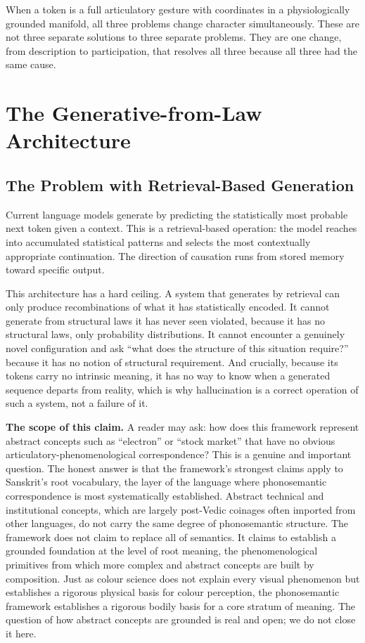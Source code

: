 \documentclass[12pt]{article}
\begin{document}
When a token is a full articulatory gesture with coordinates in a physiologically grounded manifold, all three problems change character simultaneously. These are not three separate solutions to three separate problems. They are one change, from description to participation, that resolves all three because all three had the same cause.


\section{The Generative-from-Law Architecture}

\subsection{The Problem with Retrieval-Based Generation}

Current language models generate by predicting the statistically most probable next token given a context. This is a retrieval-based operation: the model reaches into accumulated statistical patterns and selects the most contextually appropriate continuation. The direction of causation runs from stored memory toward specific output.

This architecture has a hard ceiling. A system that generates by retrieval can only produce recombinations of what it has statistically encoded. It cannot generate from structural laws it has never seen violated, because it has no structural laws, only probability distributions. It cannot encounter a genuinely novel configuration and ask ``what does the structure of this situation require?'' because it has no notion of structural requirement. And crucially, because its tokens carry no intrinsic meaning, it has no way to know when a generated sequence departs from reality, which is why hallucination is a correct operation of such a system, not a failure of it.

\textbf{The scope of this claim.} A reader may ask: how does this framework represent abstract concepts such as ``electron'' or ``stock market'' that have no obvious articulatory-phenomenological correspondence? This is a genuine and important question. The honest answer is that the framework's strongest claims apply to Sanskrit's root vocabulary, the layer of the language where phonosemantic correspondence is most systematically established. Abstract technical and institutional concepts, which are largely post-Vedic coinages often imported from other languages, do not carry the same degree of phonosemantic structure. The framework does not claim to replace all of semantics. It claims to establish a grounded foundation at the level of root meaning, the phenomenological primitives from which more complex and abstract concepts are built by composition. Just as colour science does not explain every visual phenomenon but establishes a rigorous physical basis for colour perception, the phonosemantic framework establishes a rigorous bodily basis for a core stratum of meaning. The question of how abstract concepts are grounded is real and open; we do not close it here.
\end{document}
